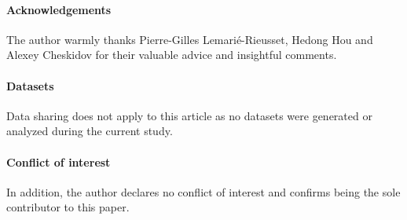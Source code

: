 \documentclass[a4paper,12pt]{amsart}
\theoremstyle{definition}
\theoremstyle{plain}
\begin{document}
\paragraph{\bf Acknowledgements} The author warmly thanks  Pierre-Gilles Lemarié-Rieusset, Hedong Hou and Alexey Cheskidov  for their valuable advice and insightful comments.
 
\paragraph{\bf Datasets} Data sharing does not apply to this article as no datasets were generated or analyzed during the
current study.
 
\paragraph{\bf  Conflict of interest} In addition, the author declares no conflict of interest and confirms being the sole contributor to this paper.
 
\end{document}

